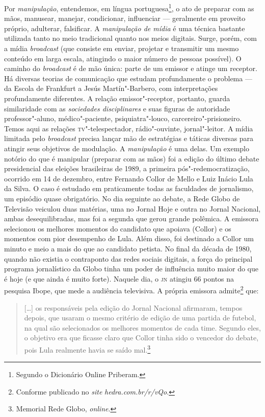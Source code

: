Por \textit{manipulação}, entendemos, em língua portuguesa\footnote{Segundo o Dicionário Online Priberam.}, o
ato de preparar com as mãos, manusear, manejar, condicionar, influenciar
--- geralmente em proveito próprio, adulterar, falsificar. A
\textit{manipulação de mídia} é uma técnica bastante utilizada tanto no
meio tradicional quanto nos meios digitais. Surge, porém, com a mídia
\textit{broadcast} (que consiste em enviar, projetar e transmitir um mesmo
conteúdo em larga escala, atingindo o maior número de pessoas possível).
O caminho do \textit{broadcast} é de mão única: parte de um emissor e
atinge um receptor. Há diversas teorias de comunicação que estudam
profundamente o problema --- da Escola de Frankfurt a Jesús
Martín"-Barbero, com interpretações profundamente diferentes. A relação
emissor"-receptor, portanto, guarda similaridade com as \textit{sociedades
disciplinares} e suas figuras de autoridade professor"-aluno,
médico"-paciente, psiquiatra"-louco, carcereiro"-prisioneiro. Temos aqui as
relações \textsc{tv}"-telespectador, rádio"-ouvinte, jornal"-leitor. A mídia
limitada pelo \textit{broadcast} precisa lançar mão de estratégias e
táticas diversas para atingir seus objetivos de modulação. A
\textit{manipulação} é uma delas. Um exemplo notório do que é manipular
(preparar com as mãos) foi a edição do último debate presidencial das
eleições brasileiras de 1989, a primeira pós"-redemocratização, ocorrido
em 14 de dezembro, entre Fernando Collor de Mello e Luiz Inácio Lula da
Silva. O caso é estudado em praticamente todas as faculdades de
jornalismo, um episódio quase obrigatório. No dia seguinte ao debate, a
Rede Globo de Televisão veiculou duas matérias, uma no Jornal Hoje e
outra no Jornal Nacional, ambas desequilibradas, mas foi a segunda que
gerou grande polêmica. A emissora selecionou os melhores momentos do
candidato que apoiava (Collor) e os momentos com pior desempenho de Lula. 
Além disso, foi destinado a Collor um minuto e meio a mais do que ao
candidato petista. No final da década de 1980, quando não existia o
contraponto das redes sociais digitais, a força do principal programa
jornalístico da Globo tinha um poder de influência muito maior do que é
hoje (e que ainda é muito forte). Naquele dia, o \textsc{jn} atingiu 66 pontos na
pesquisa Ibope, que mede a audiência televisiva. A própria emissora admite\footnote{Conforme publicado no
\textit{site} \textit{hedra.com.br/r/vQo}.} que:

\begin{quote}
{[}\ldots{}{]} os responsáveis pela edição do Jornal Nacional afirmaram, tempos
depois, que usaram o mesmo critério de edição de uma partida de futebol,
na qual são selecionados os melhores momentos de cada time. Segundo
eles, o objetivo era que ficasse claro que Collor tinha sido o vencedor
do debate, pois Lula realmente havia se saído mal.\footnote{Memorial Rede Globo,
\textit{online}.}
\end{quote}

